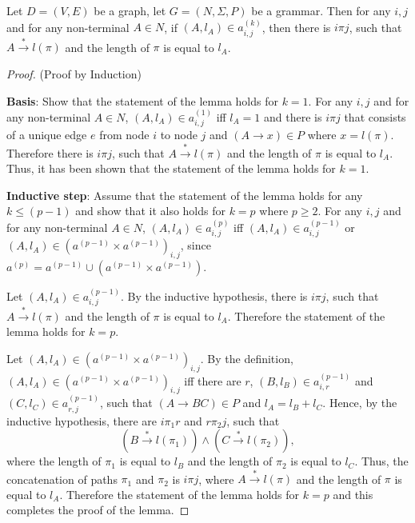 \documentclass[runningheads,a4paper]{llncs}
\begin{document}
\begin{lemma}\label{lemma:singlepath}
	Let $D = (V,E)$ be a graph, let $G =(N,\Sigma,P)$ be a grammar. Then for any $i, j$ and for any non-terminal $A \in N$, if $(A,l_A) \in a^{(k)}_{i,j}$, then there is $i \pi j$, such that $A \xrightarrow{*} l(\pi)$ and the length of $\pi$ is equal to $l_A$.
\end{lemma}
\begin{proof}(Proof by Induction)
	
	\textbf{Basis}: Show that the statement of the lemma holds for $k = 1$. For any $i, j$ and for any non-terminal $A \in N$, $(A, l_A) \in a^{(1)}_{i,j}$ iff $l_A = 1$ and there is $i \pi j$ that consists of a unique edge $e$ from node $i$ to node $j$ and $(A \rightarrow x) \in P$ where $x = l(\pi)$. Therefore there is $i \pi j$, such that $A \xrightarrow{*} l(\pi)$ and the length of $\pi$ is equal to $l_A$. Thus, it has been shown that the statement of the lemma holds for $k = 1$.
	
	\textbf{Inductive step}: Assume that the statement of the lemma holds for any $k \leq (p - 1)$ and show that it also holds for $k = p$ where $p \geq 2$. For any $i, j$ and for any non-terminal $A \in N$, $(A, l_A) \in a^{(p)}_{i,j}$ iff $(A, l_A) \in a^{(p-1)}_{i,j}$ or $(A, l_A) \in (a^{(p-1)} \times a^{(p-1)})_{i,j}$, since $a^{(p)} = a^{(p-1)} \cup (a^{(p-1)} \times a^{(p-1)}).$
	
	Let $(A, l_A) \in a^{(p-1)}_{i,j}$. By the inductive hypothesis, there is $i \pi j$, such that $A \xrightarrow{*} l(\pi)$ and the length of $\pi$ is equal to $l_A$. Therefore the statement of the lemma holds for $k = p$.
	
	Let $(A, l_A) \in (a^{(p-1)} \times a^{(p-1)})_{i,j}$. By the definition, $(A, l_A) \in (a^{(p-1)} \times a^{(p-1)})_{i,j}$ iff there are $r$, $(B, l_B) \in a^{(p-1)}_{i,r}$ and $(C, l_C) \in a^{(p-1)}_{r,j}$, such that $(A \rightarrow B C) \in P$ and $l_A = l_B + l_C$. Hence, by the inductive hypothesis, there are $i \pi_1 r$ and $r \pi_2 j$, such that $$(B \xrightarrow{*} l(\pi_1)) \wedge(C \xrightarrow{*} l(\pi_2)),$$ where the length of $\pi_1$ is equal to $l_B$ and the length of $\pi_2$ is equal to $l_C$. Thus, the concatenation of paths $\pi_1$ and $\pi_2$ is $i \pi j$, where $A \xrightarrow{*} l(\pi)$ and the length of $\pi$ is equal to $l_A$. Therefore the statement of the lemma holds for $k = p$ and this completes the proof of the lemma.
\end{proof}
\end{document}
